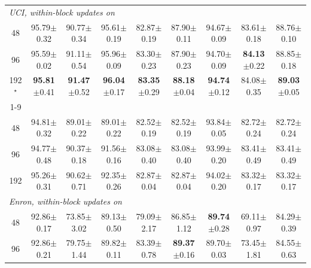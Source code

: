 \begin{table}[p]
\begin{tabular}{ccccccccc}
\midrule
\multicolumn{9}{l}{\textit{UCI, within-block updates on}} \\
48 & 95.79{\scriptsize$\pm$0.32} & 90.77{\scriptsize$\pm$0.34} & 95.61{\scriptsize$\pm$0.19} & 82.87{\scriptsize$\pm$0.19} & 87.90{\scriptsize$\pm$0.11} & 94.67{\scriptsize$\pm$0.09} & 83.61{\scriptsize$\pm$0.18} & 88.76{\scriptsize$\pm$0.10} \\
96 & 95.59{\scriptsize$\pm$0.02} & 91.11{\scriptsize$\pm$0.54} & 95.96{\scriptsize$\pm$0.09} & 83.30{\scriptsize$\pm$0.23} & 87.90{\scriptsize$\pm$0.23} & 94.70{\scriptsize$\pm$0.09} & \textbf{84.13}{\scriptsize$\pm$0.22} & 88.85{\scriptsize$\pm$0.18} \\
192$^\star$ & \textbf{95.81}{\scriptsize$\pm$0.41} & \textbf{91.47}{\scriptsize$\pm$0.52} & \textbf{96.04}{\scriptsize$\pm$0.17} & \textbf{83.35}{\scriptsize$\pm$0.29} & \textbf{88.18}{\scriptsize$\pm$0.04} & \textbf{94.74}{\scriptsize$\pm$0.12} & 84.08{\scriptsize$\pm$0.35} & \textbf{89.03}{\scriptsize$\pm$0.05} \\
\cmidrule(lr){1-9}
\multicolumn{9}{l}{\textit{UCI, within-block updates off}} \\
48 & 94.81{\scriptsize$\pm$0.32} & 89.01{\scriptsize$\pm$0.22} & 89.01{\scriptsize$\pm$0.22} & 82.52{\scriptsize$\pm$0.19} & 82.52{\scriptsize$\pm$0.19} & 93.84{\scriptsize$\pm$0.05} & 82.72{\scriptsize$\pm$0.24} & 82.72{\scriptsize$\pm$0.24} \\
96 & 94.77{\scriptsize$\pm$0.48} & 90.37{\scriptsize$\pm$0.18} & 91.56{\scriptsize$\pm$0.16} & 83.08{\scriptsize$\pm$0.40} & 83.08{\scriptsize$\pm$0.40} & 93.99{\scriptsize$\pm$0.20} & 83.41{\scriptsize$\pm$0.49} & 83.41{\scriptsize$\pm$0.49} \\
192 & 95.26{\scriptsize$\pm$0.31} & 90.62{\scriptsize$\pm$0.71} & 92.35{\scriptsize$\pm$0.26} & 82.87{\scriptsize$\pm$0.04} & 82.87{\scriptsize$\pm$0.04} & 94.02{\scriptsize$\pm$0.20} & 83.32{\scriptsize$\pm$0.17} & 83.32{\scriptsize$\pm$0.17} \\
\midrule
\multicolumn{9}{l}{\textit{Enron, within-block updates on}} \\
48 & 92.86{\scriptsize$\pm$0.17} & 73.85{\scriptsize$\pm$3.02} & 89.13{\scriptsize$\pm$0.50} & 79.09{\scriptsize$\pm$2.17} & 86.85{\scriptsize$\pm$1.12} & \textbf{89.74}{\scriptsize$\pm$0.28} & 69.11{\scriptsize$\pm$0.97} & 84.29{\scriptsize$\pm$0.39} \\
96 & 92.86{\scriptsize$\pm$0.21} & 79.75{\scriptsize$\pm$1.44} & 89.82{\scriptsize$\pm$0.11} & 83.39{\scriptsize$\pm$0.78} & \textbf{89.37}{\scriptsize$\pm$0.16} & 89.70{\scriptsize$\pm$0.03} & 73.45{\scriptsize$\pm$1.81} & 84.55{\scriptsize$\pm$0.63} \\

\end{tabular}
\end{table}
